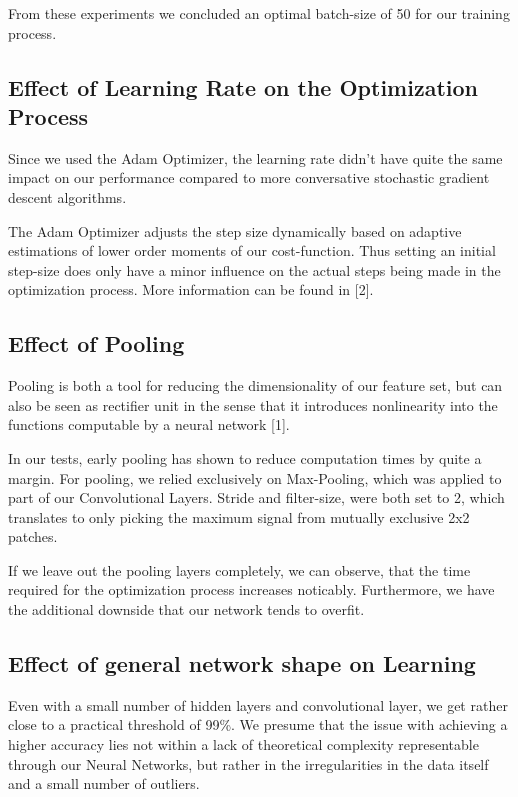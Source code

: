 \documentclass{article}
\begin{document}
From these experiments we concluded an optimal batch-size of 50 for our training process.


\subsection{Effect of Learning Rate on the Optimization Process}

Since we used the Adam Optimizer, the learning rate didn't have quite the same impact on our performance compared to more conversative stochastic gradient descent algorithms.

The Adam Optimizer adjusts the step size dynamically based on adaptive estimations of lower order moments of our cost-function. Thus setting an initial step-size does only have a minor influence on the actual steps being made in the optimization process. More information can be  found in [2].

\subsection{Effect of Pooling}
Pooling is both a tool for reducing the dimensionality of our feature set, but can also be seen as rectifier unit in the sense that it introduces nonlinearity into the functions computable by a neural network [1].

In our tests, early pooling has shown to reduce computation times by quite a margin. For pooling, we relied exclusively on Max-Pooling, which was applied to part of our Convolutional Layers. Stride and filter-size, were both set to 2, which translates to only picking the maximum signal from mutually exclusive 2x2 patches.

If we leave out the pooling layers completely, we can observe, that the time required for the optimization process  increases noticably. Furthermore, we have the additional downside that our network tends to overfit.

\subsection{Effect of general network shape on Learning}
Even with a small number of hidden layers and convolutional layer, we get rather close to a practical threshold of 99\%. We presume that the issue with achieving a higher accuracy lies not within a lack of theoretical complexity representable through our Neural Networks, but rather in the irregularities in the data itself and a small number of outliers.
\end{document}
